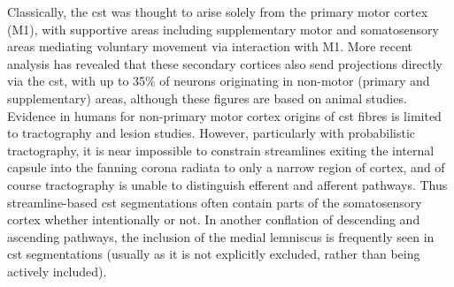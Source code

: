
Classically, the \gls{cst} was thought to arise solely from the primary motor cortex (M1), with supportive areas including supplementary motor and somatosensory areas mediating voluntary movement via interaction with M1.
More recent analysis has revealed that these secondary cortices also send projections directly via the \gls{cst},\autocite{Kandel2021} with up to 35\% of neurons originating in non-motor (primary and supplementary) areas, although these figures are based on animal studies.\autocite{Welniarz2017}
Evidence in humans for non-primary motor cortex origins of \gls{cst} fibres is limited to tractography and lesion studies.\autocite{Kumar2009,Jane1967}
However, particularly with probabilistic tractography, it is near impossible to constrain streamlines exiting the internal capsule into the fanning corona radiata to only a narrow region of cortex, and of course tractography is unable to distinguish efferent and afferent pathways.
Thus streamline-based \gls{cst} segmentations often contain parts of the somatosensory cortex whether intentionally or not.\autocite{Poulin2021}
In another conflation of descending and ascending pathways, the inclusion of the medial lemniscus is frequently seen in \gls{cst} segmentations (usually as it is not explicitly excluded, rather than being actively included).\autocite{Wasserthal2018,Warrington2020,Poulin2021}

